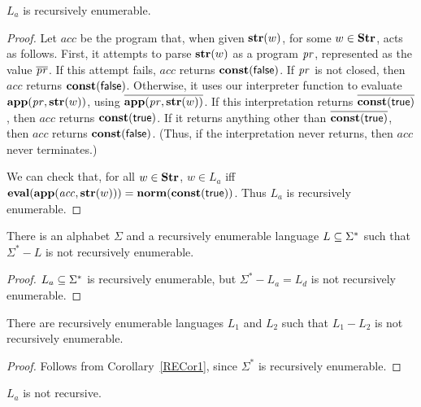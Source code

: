 \begin{theorem}
$L_a$ is recursively enumerable.
\end{theorem}

\begin{proof}
Let $\mathit{acc}$ be the program that, when given $\mathbf{str}(w)$, for
some $w\in\mathbf{Str}$, acts as follows.  First, it attempts to parse
$\mathbf{str}(w)$ as a program $\mathit{pr}$, represented as the value
$\overline{\mathit{pr}}$.  If this attempt fails, $\mathit{acc}$ returns
$\mathbf{const}(\mathsf{false})$.  If $\mathit{pr}$ is not closed, then $\mathit{acc}$
returns $\mathbf{const}(\mathsf{false})$.  Otherwise, it uses our interpreter
function to evaluate $\mathbf{app}(\mathit{pr},\mathbf{str}(w))$, using
$\overline{\mathbf{app}(\mathit{pr},\mathbf{str}(w))}$.  If this interpretation
returns $\overline{\mathbf{const}(\mathsf{true})}$, then $\mathit{acc}$ returns
$\mathbf{const}(\mathsf{true})$.  If it returns anything other than
$\overline{\mathbf{const}(\mathsf{true})}$, then $\mathit{acc}$ returns
$\mathbf{const}(\mathsf{false})$.  (Thus, if the interpretation never returns,
then $\mathit{acc}$ never terminates.)

We can check that, for all $w\in\mathbf{Str}$, $w\in L_a$ iff
$\mathbf{eval}(\mathbf{app}(\mathit{acc},\mathbf{str}(w))) =
\mathbf{norm}(\mathbf{const}(\mathsf{true}))$.  Thus $L_a$ is recursively enumerable.
\end{proof}

\begin{corollary}
\label{RECor1}

There is an alphabet $\Sigma$ and a recursively enumerable language
$L\subseteq\Sigma^*$ such that $\Sigma^*-L$ is not recursively enumerable.
\end{corollary}

\begin{proof}
$L_a\subseteq\Sigma^*$ is recursively enumerable, but
$\Sigma^*-L_a=L_d$ is not recursively enumerable.
\end{proof}

\begin{corollary}
\label{RECor2}

There are recursively enumerable languages $L_1$ and $L_2$
such that $L_1-L_2$ is not recursively enumerable.
\end{corollary}

\begin{proof}
Follows from Corollary~\ref{RECor1}, since $\Sigma^*$ is
recursively enumerable.
\end{proof}

\begin{corollary}
\label{RECor3}

$L_a$ is not recursive.
\end{corollary}

